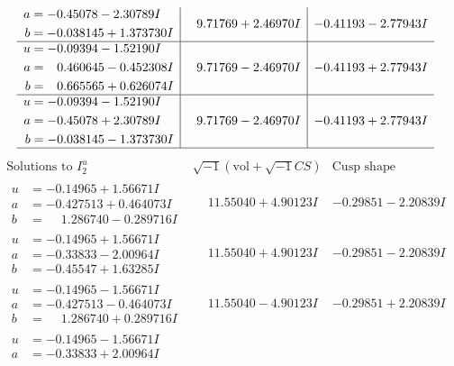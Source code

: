 \documentclass[1p]{elsarticle_modified}
\theoremstyle{definition}
\newcommand{\I}{\sqrt{-1}}
\begin{document}
$$\begin{array}{c|c|c}
\begin{aligned}
a &= -0.45078 - 2.30789 I \\
b &= -0.038145 + 1.373730 I\end{aligned}
 & \phantom{-}9.71769 + 2.46970 I & -0.41193 - 2.77943 I \\ \hline\begin{aligned}
u &= -0.09394 - 1.52190 I \\
a &= \phantom{-}0.460645 - 0.452308 I \\
b &= \phantom{-}0.665565 + 0.626074 I\end{aligned}
 & \phantom{-}9.71769 - 2.46970 I & -0.41193 + 2.77943 I \\ \hline\begin{aligned}
u &= -0.09394 - 1.52190 I \\
a &= -0.45078 + 2.30789 I \\
b &= -0.038145 - 1.373730 I\end{aligned}
 & \phantom{-}9.71769 - 2.46970 I & -0.41193 + 2.77943 I\\
 \hline 
 \end{array}$$\newpage$$\begin{array}{c|c|c}  
\text{Solutions to }I^u_{2}& \I (\text{vol} + \sqrt{-1}CS) & \text{Cusp shape}\\
 \hline 
\begin{aligned}
u &= -0.14965 + 1.56671 I \\
a &= -0.427513 + 0.464073 I \\
b &= \phantom{-}1.286740 - 0.289716 I\end{aligned}
 & \phantom{-}11.55040 + 4.90123 I & -0.29851 - 2.20839 I \\ \hline\begin{aligned}
u &= -0.14965 + 1.56671 I \\
a &= -0.33833 - 2.00964 I \\
b &= -0.45547 + 1.63285 I\end{aligned}
 & \phantom{-}11.55040 + 4.90123 I & -0.29851 - 2.20839 I \\ \hline\begin{aligned}
u &= -0.14965 - 1.56671 I \\
a &= -0.427513 - 0.464073 I \\
b &= \phantom{-}1.286740 + 0.289716 I\end{aligned}
 & \phantom{-}11.55040 - 4.90123 I & -0.29851 + 2.20839 I \\ \hline\begin{aligned}
u &= -0.14965 - 1.56671 I \\
a &= -0.33833 + 2.00964 I \\

\end{aligned}
\end{array}$$
\end{document}
